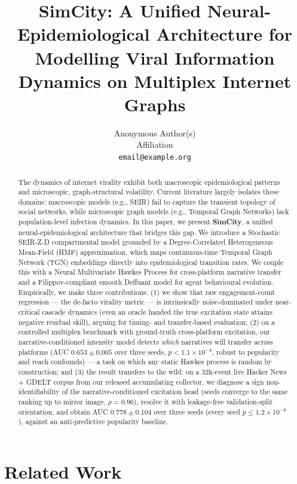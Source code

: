 \documentclass[11pt]{article}
\title{SimCity: A Unified Neural-Epidemiological Architecture for Modelling
  Viral Information Dynamics on Multiplex Internet Graphs}
\author{Anonymous Author(s) \\
  Affiliation \\
  \texttt{email@example.org}}
\begin{document}
\maketitle

\begin{abstract}
The dynamics of internet virality exhibit both macroscopic epidemiological
patterns and microscopic, graph-structural volatility. Current literature largely
isolates these domains: macroscopic models (e.g., SEIR) fail to capture the
transient topology of social networks, while microscopic graph models
(e.g., Temporal Graph Networks) lack population-level infection dynamics. In
this paper, we present \textbf{SimCity}, a unified neural-epidemiological
architecture that bridges this gap. We introduce a Stochastic SEIR-Z-D
compartmental model grounded by a Degree-Correlated Heterogeneous Mean-Field
(HMF) approximation, which maps continuous-time Temporal Graph Network (TGN)
embeddings directly into epidemiological transition rates. We couple this with a
Neural Multivariate Hawkes Process for cross-platform narrative transfer and a
Filippov-compliant smooth Deffuant model for agent behavioural evolution.
Empirically, we make three contributions: (1) we show that raw engagement-count
regression --- the de-facto virality metric --- is intrinsically noise-dominated
under near-critical cascade dynamics (even an oracle handed the true excitation
state attains negative residual skill), arguing for timing- and transfer-based
evaluation; (2) on a controlled multiplex benchmark with ground-truth
cross-platform excitation, our narrative-conditioned intensity model detects
\emph{which} narratives will transfer across platforms (AUC $0.653 \pm 0.005$
over three seeds, $p < 1.1\times10^{-4}$, robust to popularity and reach
confounds) --- a task on which any static Hawkes process is random by
construction; and (3) the result transfers to the wild: on a 32k-event live
Hacker News + GDELT corpus from our released accumulating collector, we
diagnose a sign non-identifiability of the narrative-conditioned excitation
head (seeds converge to the same ranking up to mirror image, $\rho = 0.96$),
resolve it with leakage-free validation-split orientation, and obtain AUC
$0.778 \pm 0.104$ over three seeds (every seed $p \le 1.2\times10^{-8}$),
against an anti-predictive popularity baseline.
\end{abstract}

\section{Related Work}
\label{sec:related}
\end{document}
